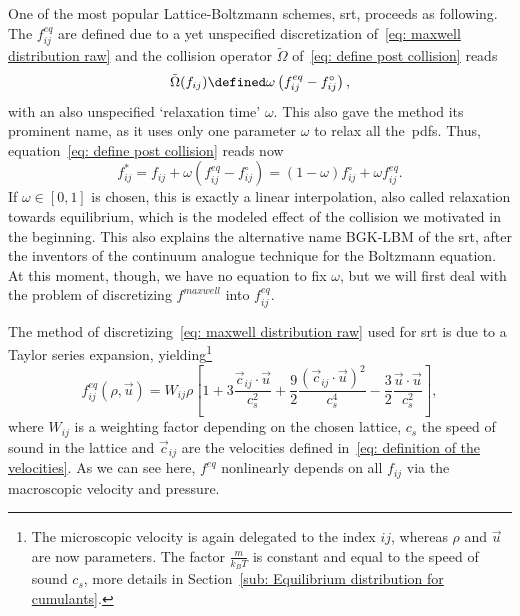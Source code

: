 One of the most popular Lattice-Boltzmann schemes, \gls{srt}, proceeds as following.
The $f_{ij}^{eq}$ are defined due to a yet unspecified discretization of~\eqref{eq: maxwell distribution raw} and the collision operator $\tilde{\Omega}$ of~\eqref{eq: define post collision} reads
\begin{equation}
  \tilde{\Omega}(f_{ij}) \defined \omega \left(f_{ij}^{eq} - f_{ij}^{\circ}\right),
\end{equation}
with an also unspecified `relaxation time' $\omega$.
This also gave the method its prominent name, as it uses only one parameter $\omega$ to relax all the~\glspl{pdf}.
Thus, equation~\eqref{eq: define post collision} reads now
\begin{equation}
  \label{eq: post collision discrete}
  f_{ij}^* = f_{ij} + \omega \left(f_{ij}^{eq} - f_{ij}^{\circ}\right) = (1-\omega)f_{ij}^{\circ} + \omega f_{ij}^{eq}.
\end{equation}
If $\omega\in[0,1]$ is chosen, this is exactly a linear interpolation, also called relaxation towards equilibrium, which is the modeled effect of the collision we motivated in the beginning.
This also explains the alternative name BGK-LBM of the \gls{srt}, after the inventors of the continuum analogue technique for the Boltzmann equation.
At this moment, though, we have no equation to fix $\omega$, but we will first deal with the problem of discretizing $f^{maxwell}$ into $f_{ij}^{eq}$.

The method of discretizing~\eqref{eq: maxwell distribution raw} used for \gls{srt} is due to a Taylor series expansion, yielding\footnote{The microscopic velocity is again delegated to the index $ij$, whereas $\rho$ and $\vec{u}$ are now parameters.
The factor $\frac{m}{k_B T}$ is constant and equal to the speed of sound $c_s$, more details in Section~\ref{sub: Equilibrium distribution for cumulants}.}
\begin{equation}
  \label{eq: equilibrium particle distributions}
  f_{ij}^{eq}(\rho,\vec{u}) = W_{ij}\rho
  \left[
    1
    + 3\frac{\vec{c}_{ij} \cdot \vec{u}}{c_s^2}
    + \frac{9}{2}\frac{{(\vec{c}_{ij} \cdot \vec{u})}^2}{c_s^4}
    - \frac{3}{2}\frac{\vec{u} \cdot \vec{u}}{c_s^2}
  \right],
\end{equation}
where $W_{ij}$ is a weighting factor depending on the chosen lattice, $c_s$ the speed of sound in the lattice and $\vec{c}_{ij}$ are the velocities defined in~\eqref{eq: definition of the velocities}.
As we can see here, $f^{eq}$ nonlinearly depends on all $f_{ij}$ via the macroscopic velocity and pressure.

